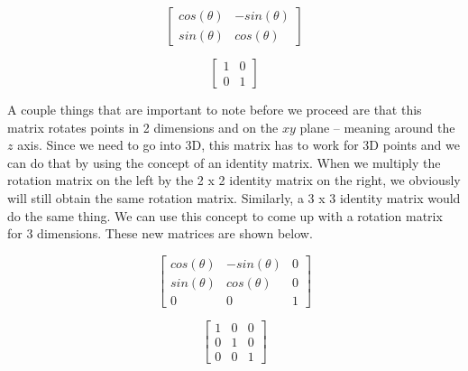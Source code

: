 \documentclass[14pt]{article}
\begin{document}
\begin{figure}[h]
	\begin{center}
		\begin{minipage}[b]{0.45\textwidth}
			\centering
			
			$$
			\begin{bmatrix}
			cos(\theta) & -sin(\theta) \\
			sin(\theta) & cos(\theta)
			\end{bmatrix}
			$$
		\end{minipage}
		\hfill
		\begin{minipage}[b]{0.45\textwidth}
			\centering
			$$
			\begin{bmatrix}
			1 & 0 \\
			0 & 1
			\end{bmatrix}			
			$$
		\end{minipage}
	\end{center}
\end{figure}

A couple things that are important to note before we proceed are that this matrix rotates points in 2 dimensions and on the $xy$ plane -- meaning around the $z$ axis. Since we need to go into 3D, this matrix has to work for 3D points and we can do that by using the concept of an identity matrix. When we multiply the rotation matrix on the left by the 2 x 2 identity matrix on the right, we obviously will still obtain the same rotation matrix. Similarly, a 3 x 3 identity matrix would do the same thing. We can use this concept to come up with a rotation matrix for 3 dimensions. These new matrices are shown below.

\begin{figure}[H]
	\vspace*{1em}
	\begin{center}
		\begin{minipage}[b]{0.45\textwidth}
			\centering
			
			$$
			\begin{bmatrix}
			cos(\theta) & -sin(\theta) & 0 \\
			sin(\theta) & cos(\theta) & 0 \\ 
			0 & 0 & 1
			\end{bmatrix}
			$$
		\end{minipage}
		\hfill
		\begin{minipage}[b]{0.45\textwidth}
			\centering
			$$
			\begin{bmatrix}
			1 & 0 & 0 \\
			0 & 1 & 0 \\
			0 & 0 & 1
			\end{bmatrix}			
			$$
		\end{minipage}
	\end{center}
\end{figure}
\end{document}
